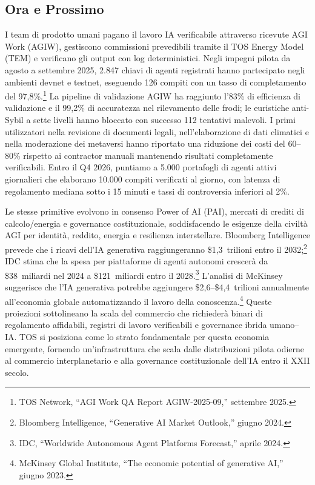 \documentclass[11pt]{article}
\begin{document}
\subsection{Ora e Prossimo}
\begin{description}[leftmargin=2.1cm, style=nextline]
  \item[12--24 Mesi] I team di prodotto umani pagano il lavoro IA verificabile attraverso ricevute AGI Work (AGIW), gestiscono commissioni prevedibili tramite il TOS Energy Model (TEM) e verificano gli output con log deterministici. Negli impegni pilota da agosto a settembre 2025, 2.847 chiavi di agenti registrati hanno partecipato negli ambienti devnet e testnet, eseguendo 126 compiti con un tasso di completamento del 97,8\%.\footnote{TOS Network, ``AGI Work QA Report AGIW-2025-09,'' settembre 2025.} La pipeline di validazione AGIW ha raggiunto l'83\% di efficienza di validazione e il 99,2\% di accuratezza nel rilevamento delle frodi; le euristiche anti-Sybil a sette livelli hanno bloccato con successo 112 tentativi malevoli. I primi utilizzatori nella revisione di documenti legali, nell'elaborazione di dati climatici e nella moderazione dei metaversi hanno riportato una riduzione dei costi del 60--80\% rispetto ai contractor manuali mantenendo risultati completamente verificabili. Entro il Q4 2026, puntiamo a 5.000 portafogli di agenti attivi giornalieri che elaborano 10.000 compiti verificati al giorno, con latenza di regolamento mediana sotto i 15 minuti e tassi di controversia inferiori al 2\%.

  \item[Arco di 100 Anni] Le stesse primitive evolvono in consenso Power of AI (PAI), mercati di crediti di calcolo/energia e governance costituzionale, soddisfacendo le esigenze della civiltà AGI per identità, reddito, energia e resilienza interstellare. Bloomberg Intelligence prevede che i ricavi dell'IA generativa raggiungeranno \$1,3~trilioni entro il 2032;\footnote{Bloomberg Intelligence, ``Generative AI Market Outlook,'' giugno 2024.} IDC stima che la spesa per piattaforme di agenti autonomi crescerà da \$38~miliardi nel 2024 a \$121~miliardi entro il 2028.\footnote{IDC, ``Worldwide Autonomous Agent Platforms Forecast,'' aprile 2024.} L'analisi di McKinsey suggerisce che l'IA generativa potrebbe aggiungere \$2,6--\$4,4~trilioni annualmente all'economia globale automatizzando il lavoro della conoscenza.\footnote{McKinsey Global Institute, ``The economic potential of generative AI,'' giugno 2023.} Queste proiezioni sottolineano la scala del commercio che richiederà binari di regolamento affidabili, registri di lavoro verificabili e governance ibrida umano--IA. TOS si posiziona come lo strato fondamentale per questa economia emergente, fornendo un'infrastruttura che scala dalle distribuzioni pilota odierne al commercio interplanetario e alla governance costituzionale dell'IA entro il XXII secolo.
\end{description}
\end{document}
